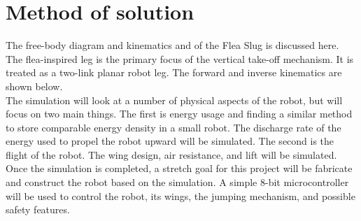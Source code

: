 \section{Method of solution}
\label{method}
\indent The free-body diagram and kinematics and of the Flea Slug is discussed here. The flea-inspired leg is the primary focus of the vertical take-off mechanism. It is treated as a two-link planar robot leg. The forward and inverse kinematics are shown below.\\



\indent The simulation will look at a number of physical aspects of the robot, but will focus on two main things. The first is energy usage and finding a similar method to store comparable energy density in a small robot. The discharge rate of the energy used to propel the robot upward will be simulated. The second is the flight of the robot. The wing design, air resistance, and lift will be simulated.\\

\indent Once the simulation is completed, a stretch goal for this project will be fabricate and construct the robot based on the simulation. A simple 8-bit microcontroller will be used to control the robot, its wings, the jumping mechanism, and possible safety features.\\

